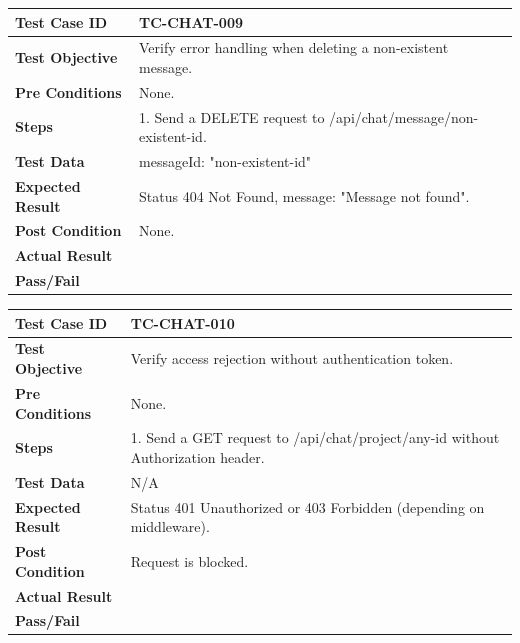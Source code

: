 \begin{longtable}{|p{}|p{}|}
\hline
\textbf{Test Case ID} & TC-CHAT-009 \\ \hline
\textbf{Test Objective} & Verify error handling when deleting a non-existent message. \\ \hline
\textbf{Pre Conditions} & None. \\ \hline
\textbf{Steps} & 
1. Send a DELETE request to /api/chat/message/non-existent-id. \\ \hline
\textbf{Test Data} & messageId: "non-existent-id" \\ \hline
\textbf{Expected Result} & Status 404 Not Found, message: "Message not found". \\ \hline
\textbf{Post Condition} & None. \\ \hline
\textbf{Actual Result} &  \\ \hline
\textbf{Pass/Fail} &  \\ \hline
\end{longtable}

\begin{longtable}{|p{}|p{}|}
\hline
\textbf{Test Case ID} & TC-CHAT-010 \\ \hline
\textbf{Test Objective} & Verify access rejection without authentication token. \\ \hline
\textbf{Pre Conditions} & None. \\ \hline
\textbf{Steps} & 
1. Send a GET request to /api/chat/project/any-id without Authorization header. \\ \hline
\textbf{Test Data} & N/A \\ \hline
\textbf{Expected Result} & Status 401 Unauthorized or 403 Forbidden (depending on middleware). \\ \hline
\textbf{Post Condition} & Request is blocked. \\ \hline
\textbf{Actual Result} &  \\ \hline
\textbf{Pass/Fail} &  \\ \hline
\end{longtable}